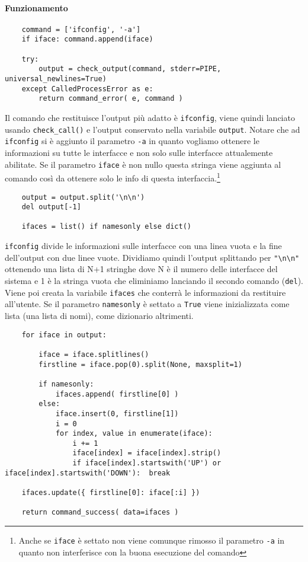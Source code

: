 \documentclass[11pt]{article}
\begin{document}
\paragraph{Funzionamento}
\begin{lstlisting}
    command = ['ifconfig', '-a']
    if iface: command.append(iface)

    try:
        output = check_output(command, stderr=PIPE, universal_newlines=True)
    except CalledProcessError as e:
        return command_error( e, command )
\end{lstlisting}
Il comando che restituisce l'output più adatto è \texttt{ifconfig}, viene quindi lanciato usando \texttt{check\_call()}
e l'output conservato nella variabile \texttt{output}.
Notare che ad \texttt{ifconfig} si è aggiunto il parametro \texttt{-a} in quanto vogliamo ottenere le informazioni
su tutte le interfacce e non solo sulle interfacce attualemente abilitate.
Se il parametro \texttt{iface} è non nullo questa stringa viene aggiunta al comando così da ottenere solo le info
di questa interfaccia.\footnote{\label{ifconfignoproblem}Anche se \texttt{iface} è settato non viene comunque rimosso
il parametro \texttt{-a} in quanto non interferisce con la buona esecuzione del comando}
\begin{lstlisting}
    output = output.split('\n\n')
    del output[-1]

    ifaces = list() if namesonly else dict()
\end{lstlisting}
\texttt{ifconfig} divide le informazioni sulle interfacce con una linea vuota e la fine dell'output con due linee vuote.
Dividiamo quindi l'output splittando per \texttt{"\textbackslash n\textbackslash n"} ottenendo una lista di N+1 stringhe
dove N è il numero delle interfacce del sistema e 1 è la stringa vuota che eliminiamo lanciando il secondo comando (\texttt{del}).\\
Viene poi creata la variabile \texttt{ifaces} che conterrà le informazioni da restituire all'utente.
Se il parametro \texttt{namesonly} è settato a \texttt{True} viene inizializzata come lista (una lista di nomi),
come dizionario altrimenti.
\begin{lstlisting}
    for iface in output:

        iface = iface.splitlines()
        firstline = iface.pop(0).split(None, maxsplit=1)

        if namesonly:
            ifaces.append( firstline[0] )
        else:
            iface.insert(0, firstline[1])
            i = 0
            for index, value in enumerate(iface):
                i += 1
                iface[index] = iface[index].strip()
                if iface[index].startswith('UP') or iface[index].startswith('DOWN'):  break

	ifaces.update({ firstline[0]: iface[:i] })

    return command_success( data=ifaces )
\end{lstlisting}
\end{document}
